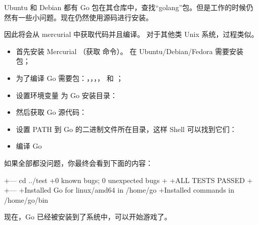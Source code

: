 Ubuntu 和 Debian 都有 Go 包在其仓库中，查找“golang”包。但是工作的时候仍然有一些小问题。现在仍然使用源码进行安装。

因此将会从 mercurial 中获取代码并且编译。
对于其他类 Unix 系统，过程类似。
\begin{itemize}
\item 首先安装 Mercurial （获取  命令）。
在 Ubuntu/Debian/Fedora 需要安装  包；

\item 为了编译 Go 需要包：，，，， 和 ；

\item 设置环境变量  为 Go 安装目录：
\begin{display}
\pr {}
\end{display}

\item 然后获取 Go 源代码：
\begin{display}
\pr {}
\end{display}

\item 设置 PATH 到 Go 的二进制文件所在目录，这样 Shell 可以找到它们：
\begin{display}
\pr {}
\end{display}

\item 编译 Go
\begin{display}
\pr {}
\pr {}
\end{display}
\end{itemize}
如果全部都没问题，你最终会看到下面的内容：
\begin{display}
+--- cd ../test
+0 known bugs; 0 unexpected bugs
+
+ALL TESTS PASSED
+
+---
+Installed Go for linux/amd64 in /home/go
+Installed commands in /home/go/bin
\end{display}
现在，Go 已经被安装到了系统中，可以开始游戏了。

